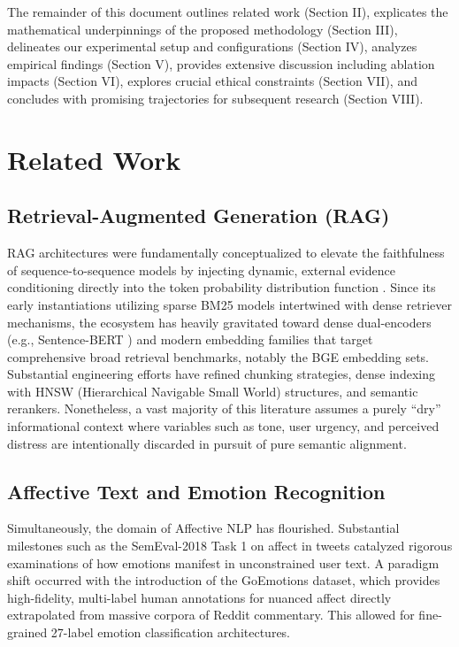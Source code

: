 \documentclass[conference]{IEEEtran}
\begin{document}
The remainder of this document outlines related work (Section II), explicates the mathematical underpinnings of the proposed methodology (Section III), delineates our experimental setup and configurations (Section IV), analyzes empirical findings (Section V), provides extensive discussion including ablation impacts (Section VI), explores crucial ethical constraints (Section VII), and concludes with promising trajectories for subsequent research (Section VIII).


\section{Related Work}

\subsection{Retrieval-Augmented Generation (RAG)}
RAG architectures were fundamentally conceptualized to elevate the faithfulness of sequence-to-sequence models by injecting dynamic, external evidence conditioning directly into the token probability distribution function \cite{1}. Since its early instantiations utilizing sparse BM25 models intertwined with dense retriever mechanisms, the ecosystem has heavily gravitated toward dense dual-encoders (e.g., Sentence-BERT \cite{4}) and modern embedding families that target comprehensive broad retrieval benchmarks, notably the BGE embedding sets. Substantial engineering efforts have refined chunking strategies, dense indexing with HNSW (Hierarchical Navigable Small World) structures, and semantic rerankers. Nonetheless, a vast majority of this literature assumes a purely ``dry'' informational context where variables such as tone, user urgency, and perceived distress are intentionally discarded in pursuit of pure semantic alignment.

\subsection{Affective Text and Emotion Recognition}
Simultaneously, the domain of Affective NLP has flourished. Substantial milestones such as the SemEval-2018 Task 1 on affect in tweets \cite{5} catalyzed rigorous examinations of how emotions manifest in unconstrained user text. A paradigm shift occurred with the introduction of the GoEmotions \cite{2} dataset, which provides high-fidelity, multi-label human annotations for nuanced affect directly extrapolated from massive corpora of Reddit commentary. This allowed for fine-grained 27-label emotion classification architectures. 
\end{document}
